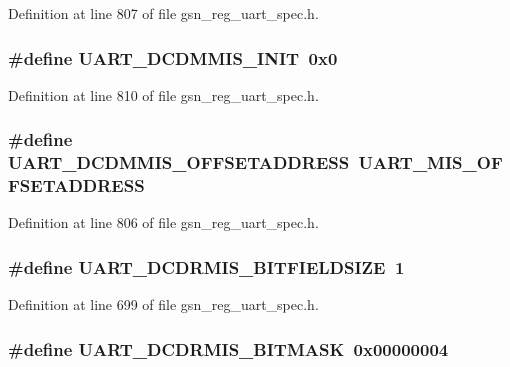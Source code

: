 Definition at line 807 of file gsn\_\-reg\_\-uart\_\-spec.h.

\hypertarget{a00575_a51570ca51485105a3b726a5cfa524be2}{
\subsubsection[{UART\_\-DCDMMIS\_\-INIT}]{\setlength{\rightskip}{0pt plus 5cm}\#define UART\_\-DCDMMIS\_\-INIT~0x0}}
\label{a00575_a51570ca51485105a3b726a5cfa524be2}


Definition at line 810 of file gsn\_\-reg\_\-uart\_\-spec.h.

\hypertarget{a00575_a812eb554e9f1c6e2e07e40770441fc32}{
\subsubsection[{UART\_\-DCDMMIS\_\-OFFSETADDRESS}]{\setlength{\rightskip}{0pt plus 5cm}\#define UART\_\-DCDMMIS\_\-OFFSETADDRESS~UART\_\-MIS\_\-OFFSETADDRESS}}
\label{a00575_a812eb554e9f1c6e2e07e40770441fc32}


Definition at line 806 of file gsn\_\-reg\_\-uart\_\-spec.h.

\hypertarget{a00575_a85c0d487d399db3634809c28b5e144bc}{
\subsubsection[{UART\_\-DCDRMIS\_\-BITFIELDSIZE}]{\setlength{\rightskip}{0pt plus 5cm}\#define UART\_\-DCDRMIS\_\-BITFIELDSIZE~1}}
\label{a00575_a85c0d487d399db3634809c28b5e144bc}


Definition at line 699 of file gsn\_\-reg\_\-uart\_\-spec.h.

\hypertarget{a00575_a0615e6af15e997406fe3702a13c99d19}{
\subsubsection[{UART\_\-DCDRMIS\_\-BITMASK}]{\setlength{\rightskip}{0pt plus 5cm}\#define UART\_\-DCDRMIS\_\-BITMASK~0x00000004}}
\label{a00575_a0615e6af15e997406fe3702a13c99d19}


